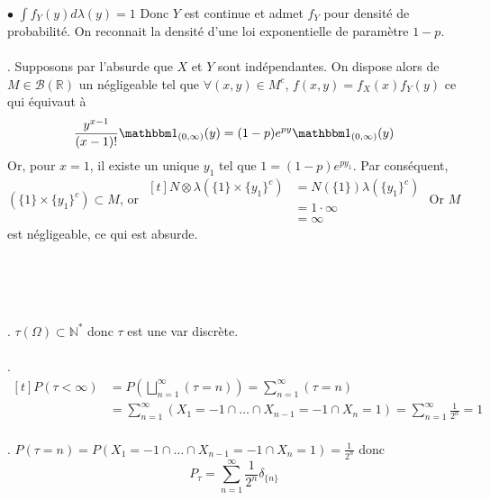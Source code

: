 \documentclass{report}
\begin{document}
$\bullet$ $\int f_Y(y) d\lambda(y)=1$\newline
Donc $Y$ est continue et admet $f_Y$ pour densité de probabilité. On reconnait la densité d'une loi exponentielle de paramètre $1-p$.\\ \\
. Supposons par l'absurde que $X$ et $Y$ sont indépendantes. On dispose alors de $M\in \mathcal B(\mathbb R)$ un négligeable tel que $\forall (x,y)\in M^c$, $f(x,y)=f_X(x)f_Y(y)$ ce qui équivaut à $$\frac{y^{x-1}}{(x-1)!}\mathbbm 1_{(0,\infty)}(y) = (1-p)e^{py}\mathbbm 1_{(0,\infty)}(y)$$
Or, pour $x=1$, il existe un unique $y_1$ tel que $1=(1-p)e^{py_1}$. \newline
Par conséquent, $(\{1\}\times \{y_1\}^c)\subset M$, or $\begin{aligned}[t] N\otimes \lambda(\{1\}\times \{y_1\}^c) &= N(\{1\})\lambda(\{y_1\}^c) \\
&=1\cdot \infty\\
&= \infty \end{aligned}$\newline
Or $M$ est négligeable, ce qui est absurde.

\subsection{} \noindent{}\\ 
\\ 
\\
. $\tau(\Omega)\subset \mathbb N^*$ donc $\tau$ est une var discrète. \\ \\
. $\begin{aligned}[t]
P(\tau <\infty) &= P(\bigsqcup_{n=1}^\infty (\tau = n)) = \sum_{n=1}^\infty (\tau = n) \\
&= \sum_{n=1}^\infty (X_1=-1\cap \ldots \cap X_{n-1}=-1 \cap X_n=1 ) = \sum_{n=1}^\infty \frac 1{2^n}=1 
\end{aligned}$\\ \\
. $P(\tau = n) = P(X_1=-1\cap \ldots \cap X_{n-1}=-1 \cap X_n=1 ) = \frac 1{2^n}$\newline
donc $$P_{\tau}= \sum_{n=1}^\infty \frac 1{2^n}\delta_{\{n\}}$$
\end{document}

